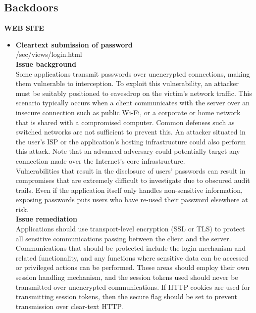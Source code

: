 \subsection{Backdoors}

\begin{center}
\textbf{WEB SITE}
\end{center}
\begin{itemize}  
\item \textbf{Cleartext submission of password} \\
/sec/views/login.html \\

\textbf{Issue background}\\
Some applications transmit passwords over unencrypted connections, making them vulnerable to interception. To exploit this vulnerability, an attacker must be suitably positioned to eavesdrop on the victim's network traffic. This scenario typically occurs when a client communicates with the server over an insecure connection such as public Wi-Fi, or a corporate or home network that is shared with a compromised computer. Common defenses such as switched networks are not sufficient to prevent this. An attacker situated in the user's ISP or the application's hosting infrastructure could also perform this attack. Note that an advanced adversary could potentially target any connection made over the Internet's core infrastructure.\\

Vulnerabilities that result in the disclosure of users' passwords can result in compromises that are extremely difficult to investigate due to obscured audit trails. Even if the application itself only handles non-sensitive information, exposing passwords puts users who have re-used their password elsewhere at risk.\\

\textbf{Issue remediation}\\
Applications should use transport-level encryption (SSL or TLS) to protect all sensitive communications passing between the client and the server. Communications that should be protected include the login mechanism and related functionality, and any functions where sensitive data can be accessed or privileged actions can be performed. These areas should employ their own session handling mechanism, and the session tokens used should never be transmitted over unencrypted communications. If HTTP cookies are used for transmitting session tokens, then the secure flag should be set to prevent transmission over clear-text HTTP.


\end{itemize}
